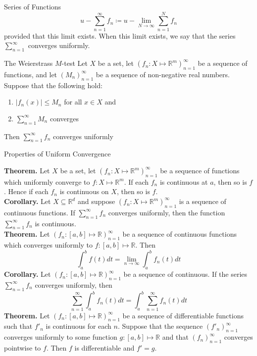 \documentclass{article}
\newcommand{\real}{\mathbb{R}}
\begin{document}
\begin{multicols*}{3}
\begin{blackbox}{Series of Functions}
    \[u-\sum_{n=1}^\infty f_n \coloneqq u-\lim_{N\rightarrow\infty} \sum_{n=1}^N f_n\]
    provided that this limit exists. When this limit exists, we say that the series $\sum\limits_{n=1}^\infty$ converges uniformly. 
    \begin{brownbox}{The Weierstrass $M$-test}
    Let $X$ be a set, let $(f_n: X \mapsto \real^m)_{n=1}^\infty$ be a sequence of functions, and let $(M_n)_{n=1}^\infty$ be a sequence of non-negative real numbers. Suppose that the following hold: 
    \begin{enumerate}[label=(\roman*)]
        \item $|f_n(x)| \leq M_n$ for all $x \in X$ and 
        \item $\sum\limits_{n=1}^\infty M_n$ converges
    \end{enumerate}
        Then $\sum\limits_{n=1}^\infty f_n$ converges uniformly\\[-2ex]
    \end{brownbox}
    \begin{bluebox}{Properties of Uniform Convergence}
        \raggedright
        \textbf{Theorem.} Let $X$ be a set, let $(f_n: X \mapsto \real^m)_{n=1}^\infty$ be a sequence of functions which uniformly converge to $f: X \mapsto \real^m$. If each $f_n$ is continuous at $a$, then so is $f$. Hence if each $f_n$ is continuous on $X$, then so is $f$.\\[1ex]
        \textbf{Corollary.} Let $X \subseteq \real^d$ and suppose $(f_n: X \mapsto \real^m)_{n=1}^\infty$ is a sequence of continuous functions. If $\sum\limits_{n=1}^\infty f_n$ converges uniformly, then the function $\sum_{n=1}^\infty f_n$ is continuous. \\[1ex]
        \textbf{Theorem.} Let $(f_n: [a,b] \mapsto \real)_{n=1}^\infty$ be a sequence of continuous functions which converges uniformly to $f: [a,b] \mapsto \real$. Then \\[-1.5ex]
        \[\int_a^b f(t) dt = \lim_{n \rightarrow \infty} \int_a^b f_n(t)dt\]
        \textbf{Corollary.}  Let $(f_n: [a,b] \mapsto \real)_{n=1}^\infty$ be a sequence of continuous. If the series $\sum\limits_{n=1}^\infty f_n$ converges uniformly, then\\[-1ex]
        \[\sum_{n=1}^\infty \int_a^b f_n(t) dt = \int_a^b \sum_{n=1}^\infty f_n(t)dt\]
        \textbf{Theorem.} Let $(f_n: [a,b] \mapsto \real)_{n=1}^\infty$ be a sequence of differentiable functions such that $f'_n$ is continuous for each $n$. Suppose that the sequence $(f'_n)_{n=1}^\infty$ converges uniformly to some function $g: [a,b] \mapsto \real$ and that $(f_n)_{n=1}^\infty$ converges pointwise to $f$. Then $f$ is differentiable and $f' = g$.

\end{bluebox}
\end{blackbox}
\end{multicols*}
\end{document}
